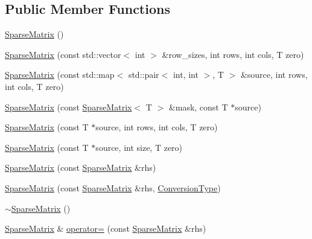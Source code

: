 \subsection*{Public Member Functions}
\begin{DoxyCompactItemize}
\item 
\hyperlink{class_c_o_n_t_r_a_l_i_g_n_1_1_sparse_matrix_a7da65ce6bc06d6891d20c237819e3483}{Sparse\+Matrix} ()
\item 
\hyperlink{class_c_o_n_t_r_a_l_i_g_n_1_1_sparse_matrix_a552763656a10a538472c300c98b852ae}{Sparse\+Matrix} (const std\+::vector$<$ int $>$ \&row\+\_\+sizes, int rows, int cols, T zero)
\item 
\hyperlink{class_c_o_n_t_r_a_l_i_g_n_1_1_sparse_matrix_af2fce5a9705d04673d9799d07dc0504d}{Sparse\+Matrix} (const std\+::map$<$ std\+::pair$<$ int, int $>$, T $>$ \&source, int rows, int cols, T zero)
\item 
\hyperlink{class_c_o_n_t_r_a_l_i_g_n_1_1_sparse_matrix_a80e3faa4c63484dd0870db0096d3d7d1}{Sparse\+Matrix} (const \hyperlink{class_c_o_n_t_r_a_l_i_g_n_1_1_sparse_matrix}{Sparse\+Matrix}$<$ T $>$ \&mask, const T $\ast$source)
\item 
\hyperlink{class_c_o_n_t_r_a_l_i_g_n_1_1_sparse_matrix_aa465ecbc49b7788ef01383de2dd58baa}{Sparse\+Matrix} (const T $\ast$source, int rows, int cols, T zero)
\item 
\hyperlink{class_c_o_n_t_r_a_l_i_g_n_1_1_sparse_matrix_abd2bc99d47991f738b20707adfd38599}{Sparse\+Matrix} (const T $\ast$source, int size, T zero)
\item 
\hyperlink{class_c_o_n_t_r_a_l_i_g_n_1_1_sparse_matrix_a355d82dc2ed5df858c5e6d49a91d660b}{Sparse\+Matrix} (const \hyperlink{class_c_o_n_t_r_a_l_i_g_n_1_1_sparse_matrix}{Sparse\+Matrix} \&rhs)
\item 
\hyperlink{class_c_o_n_t_r_a_l_i_g_n_1_1_sparse_matrix_a7ba7f34a389de19e3b087502238c7de2}{Sparse\+Matrix} (const \hyperlink{class_c_o_n_t_r_a_l_i_g_n_1_1_sparse_matrix}{Sparse\+Matrix} \&rhs, \hyperlink{class_c_o_n_t_r_a_l_i_g_n_1_1_sparse_matrix_a33a2e14b850b1767494ef115a660cf1c}{Conversion\+Type})
\item 
\hyperlink{class_c_o_n_t_r_a_l_i_g_n_1_1_sparse_matrix_a36a131a4a059fa9f6103c3877b392303}{$\sim$\+Sparse\+Matrix} ()
\item 
\hyperlink{class_c_o_n_t_r_a_l_i_g_n_1_1_sparse_matrix}{Sparse\+Matrix} \& \hyperlink{class_c_o_n_t_r_a_l_i_g_n_1_1_sparse_matrix_a97eb74b6bbf93d9092838651da4f0cb7}{operator=} (const \hyperlink{class_c_o_n_t_r_a_l_i_g_n_1_1_sparse_matrix}{Sparse\+Matrix} \&rhs)

\end{DoxyCompactItemize}
